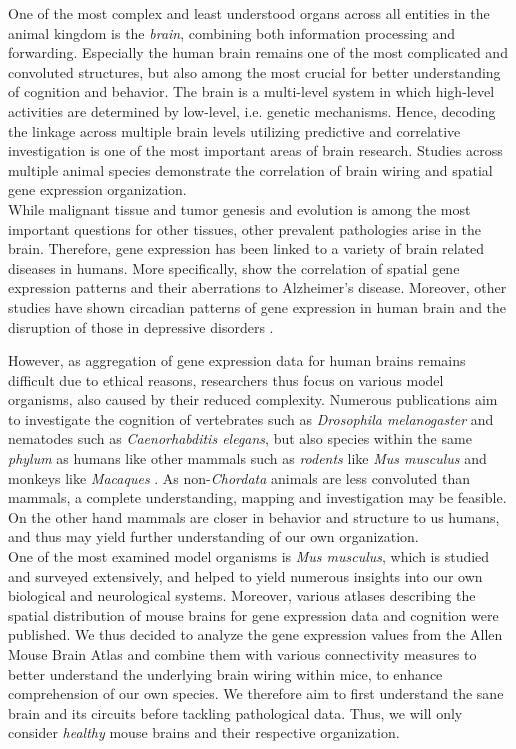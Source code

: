 \documentclass[]{article}
\renewcommand{\cite}{\citep}
\begin{document}
One of the most complex and least understood organs across all entities in the animal kingdom is the \textit{brain}, combining both information processing and forwarding. Especially the human brain remains one of the most complicated and convoluted structures, but also among the most crucial for better understanding of cognition and behavior. 
The brain is a multi-level system in which high-level activities are determined by low-level, i.e. genetic mechanisms. Hence, decoding the linkage across multiple brain levels utilizing predictive and correlative investigation is one of the most important areas of brain research. Studies across multiple animal species demonstrate the correlation of brain wiring and spatial gene expression organization.\\

While malignant tissue and tumor genesis and evolution is among the most important questions for other tissues, other prevalent pathologies arise in the brain. Therefore, gene expression has been linked to a variety of brain related diseases in humans. More specifically, \citet{twine2011whole} show the correlation of spatial gene expression patterns and their aberrations to Alzheimer's disease. Moreover, other studies have shown circadian patterns of gene expression in human brain and the disruption of those in depressive disorders \cite{li2013circadian}. 

However, as aggregation of gene expression data for human brains remains difficult due to ethical reasons, researchers thus focus on various model organisms, also caused by their reduced complexity. Numerous publications aim to investigate the cognition of vertebrates such as \textit{Drosophila melanogaster} and nematodes such as \textit{Caenorhabditis elegans}, but also species within the same \textit{phylum} as humans like other mammals such as \textit{rodents} like \textit{Mus musculus} \cite{bohland2010clustering} and monkeys like \textit{Macaques} \cite{ValkShapingBrainStructure2020}. As non-\textit{Chordata} animals are less convoluted than mammals, a complete understanding, mapping and investigation may be feasible. On the other hand mammals are closer in behavior and structure to us humans, and thus may yield further understanding of our own organization. \\
One of the most examined model organisms is \textit{Mus musculus}, which is studied and surveyed extensively, and helped to yield numerous insights into our own biological and neurological systems. Moreover, various atlases describing the spatial distribution of mouse brains for gene expression data and cognition were published. We thus decided to analyze the gene expression values from the Allen Mouse Brain Atlas and combine them with various connectivity measures to better understand the underlying brain wiring within mice, to enhance comprehension of our own species. We therefore aim to first understand the sane brain and its circuits before tackling pathological data. Thus, we will only consider \textit{healthy} mouse brains and their respective organization.\\
\end{document}
